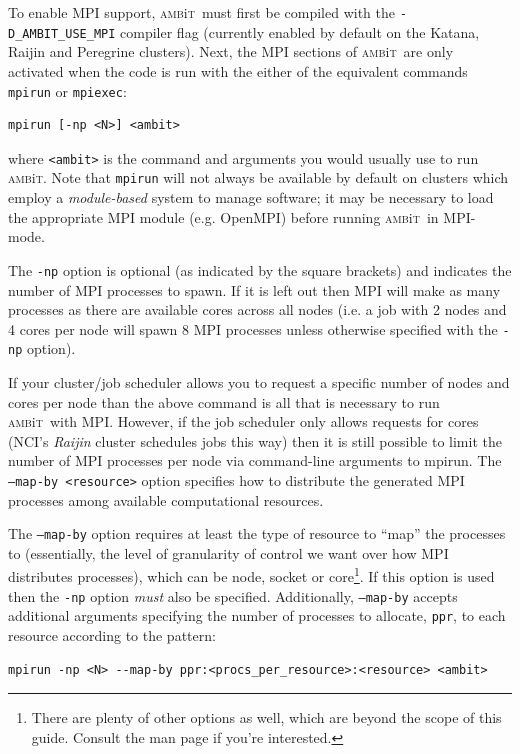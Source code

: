 \documentclass{report}
\newcommand{\ambit}{\textsc{amb}{\footnotesize i}\textsc{t}}
\begin{document}
To enable MPI support, \ambit\ must first be compiled with the \texttt{-D\_AMBIT\_USE\_MPI} compiler flag
(currently enabled by default on the Katana, Raijin and Peregrine clusters). Next, the MPI sections of
\ambit\ are only activated when the code is run with the either of the equivalent commands 
\texttt{mpirun} or \texttt{mpiexec}:

\begin{verbatim}
mpirun [-np <N>] <ambit>
\end{verbatim}

where \texttt{<ambit>} is the command and arguments you would usually use to run \ambit. Note that
\texttt{mpirun} will not always be available by default on clusters which employ a \textit{module-based}
system to manage software; it may be necessary to load the appropriate MPI module (e.g. OpenMPI) before
running \ambit\ in MPI-mode.

The \texttt{-np} option is optional (as indicated by the square brackets) and indicates the number of MPI
processes to spawn. If it is left out then MPI will make as many processes as there are available cores
across all nodes (i.e. a job with 2 nodes and 4 cores per node will spawn 8 MPI processes unless
otherwise specified with the \texttt{-np} option).

If your cluster/job scheduler allows you to request a specific number of nodes and cores per node
than the above command is all that is necessary to run \ambit\ with MPI. However, if the job scheduler
only allows requests for cores (NCI's \textit{Raijin} cluster schedules jobs this way) then it is still
possible to limit the number of MPI processes per node via command-line arguments to mpirun. The
\texttt{--map-by <resource>} option specifies how to distribute the generated MPI processes among
available computational resources.

The \texttt{--map-by} option requires at least the type of resource to ``map'' the processes to
(essentially, the level of granularity of control we want over how MPI distributes processes), which can
be node, socket or core\footnote{There are plenty of other options as well, which are beyond the
scope of this guide. Consult the man page if you're interested.}. If this option is used then the
\texttt{-np} option \textit{must} also be specified. Additionally, \texttt{--map-by} accepts
additional arguments specifying the number of processes to allocate, \texttt{ppr}, to each resource 
according to the pattern:

\begin{verbatim}
mpirun -np <N> --map-by ppr:<procs_per_resource>:<resource> <ambit>
\end{verbatim}
\end{document}
